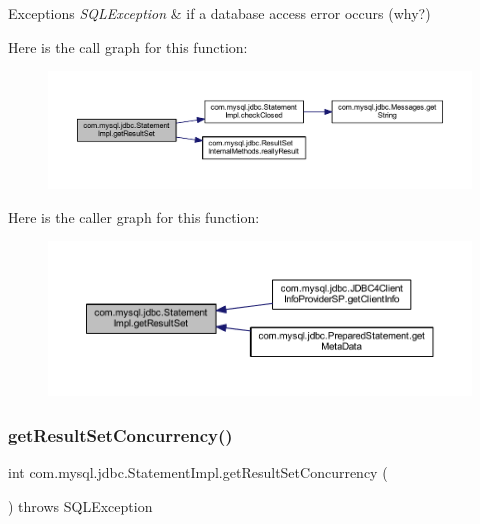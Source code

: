 \begin{DoxyExceptions}{Exceptions}
{\em S\+Q\+L\+Exception} & if a database access error occurs (why?) \\
\hline
\end{DoxyExceptions}
Here is the call graph for this function\+:
\nopagebreak
\begin{figure}[H]
\begin{center}
\leavevmode
\includegraphics[width=350pt]{classcom_1_1mysql_1_1jdbc_1_1_statement_impl_a0e97bb2074d21e45c4849e5c2b1dd0ef_cgraph}
\end{center}
\end{figure}
Here is the caller graph for this function\+:
\nopagebreak
\begin{figure}[H]
\begin{center}
\leavevmode
\includegraphics[width=350pt]{classcom_1_1mysql_1_1jdbc_1_1_statement_impl_a0e97bb2074d21e45c4849e5c2b1dd0ef_icgraph}
\end{center}
\end{figure}
\mbox{\label{classcom_1_1mysql_1_1jdbc_1_1_statement_impl_ae2c130613ff533e0b972f7c6994363ba}} 
\subsubsection{\texorpdfstring{get\+Result\+Set\+Concurrency()}{getResultSetConcurrency()}}
{\footnotesize\ttfamily int com.\+mysql.\+jdbc.\+Statement\+Impl.\+get\+Result\+Set\+Concurrency (\begin{DoxyParamCaption}{ }\end{DoxyParamCaption}) throws S\+Q\+L\+Exception}

